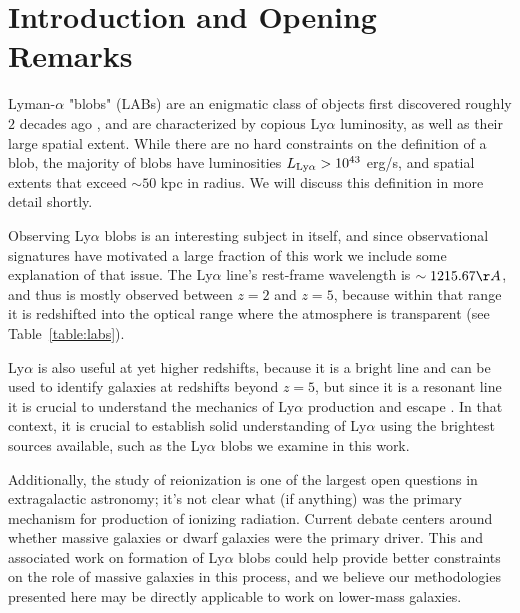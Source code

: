 \chapter{Introduction and Opening Remarks}
\label{sec:intro}

Lyman-$\alpha$ "blobs" (LABs) are an enigmatic class of objects first discovered roughly $2$ decades ago \citep{Fynbo1999,Steidel2000}, and are characterized by copious Ly$\alpha$ luminosity, as well as their large spatial extent.
While there are no hard constraints on the definition of a blob, the majority of blobs have luminosities $L_{\rm{Ly}\alpha} > 10^{43}$ erg/s, and spatial extents that exceed $\sim50$ kpc in radius.
We will discuss this definition in more detail shortly.

Observing Ly$\alpha$ blobs is an interesting subject in itself, and since observational signatures have motivated a large fraction of this work we include some explanation of that issue.
The Ly$\alpha$ line's rest-frame wavelength is $\sim 1215.67 \AA$, and thus is mostly observed between $z=2$ and $z=5$, because within that range it is redshifted into the optical range where the atmosphere is transparent (see Table~\ref{table:labs}).

Ly$\alpha$ is also useful at yet higher redshifts, because it is a bright line and can be used to identify galaxies at redshifts beyond $z=5$, but since it is a resonant line it is crucial to understand the mechanics of Ly$\alpha$ production and escape \citep{Ao2015}.
In that context, it is crucial to establish solid understanding of Ly$\alpha$ using the brightest sources available, such as the Ly$\alpha$ blobs we examine in this work.

Additionally, the study of reionization is one of the largest open questions in extragalactic astronomy; it's not clear what (if anything) was the primary mechanism for production of ionizing radiation.
Current debate centers around whether massive galaxies \citep{Naidu2019} or dwarf galaxies \citep{Finkelstein2019} were the primary driver.
This and associated work on formation of Ly$\alpha$ blobs could help provide better constraints on the role of massive galaxies in this process, and we believe our methodologies presented here may be directly applicable to work on lower-mass galaxies.

